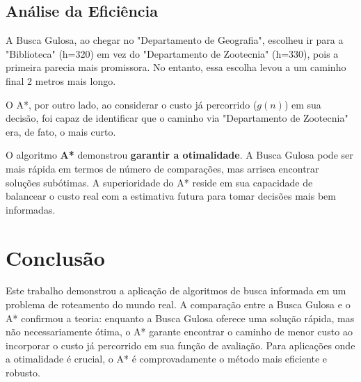 \documentclass[12pt, a4paper]{article}
\begin{document}
\subsection{Análise da Eficiência}
A Busca Gulosa, ao chegar no "Departamento de Geografia", escolheu ir para a "Biblioteca" (h=320) em vez do "Departamento de Zootecnia" (h=330), pois a primeira parecia mais promissora. No entanto, essa escolha levou a um caminho final 2 metros mais longo.

O A*, por outro lado, ao considerar o custo já percorrido ($g(n)$) em sua decisão, foi capaz de identificar que o caminho via "Departamento de Zootecnia" era, de fato, o mais curto.

O algoritmo \textbf{A*} demonstrou \textbf{garantir a otimalidade}. A Busca Gulosa pode ser mais rápida em termos de número de comparações, mas arrisca encontrar soluções subótimas. A superioridade do A* reside em sua capacidade de balancear o custo real com a estimativa futura para tomar decisões mais bem informadas.

\section{Conclusão}
Este trabalho demonstrou a aplicação de algoritmos de busca informada em um problema de roteamento do mundo real. A comparação entre a Busca Gulosa e o A* confirmou a teoria: enquanto a Busca Gulosa oferece uma solução rápida, mas não necessariamente ótima, o A* garante encontrar o caminho de menor custo ao incorporar o custo já percorrido em sua função de avaliação. Para aplicações onde a otimalidade é crucial, o A* é comprovadamente o método mais eficiente e robusto.

% 
% 


\end{document}
